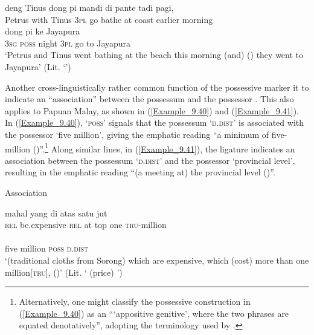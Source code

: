 \ea
\label{Example_9.39}
 {{deng}} {Tinus} {{dong}} {{pi}} {{mandi}} {di} {pante} {tadi} {pagi,}\\ %
 {Petrus}  {with}  Tinus  {\textsc{3pl}}  {go}  {bathe}  at  coast  earlier  morning\\
\gll  {}  {}  {}  {dong}  {pi}  ke  {Jayapura}\\
 \textsc{3sg}  {\textsc{poss}}  {night}  {\textsc{3pl}}  {go}  to  {Jayapura}\\
\glt 
‘Petrus and Tinus went bathing at the beach this morning (and)  ()  they went to Jayapura’ (Lit. ‘’) \textstyleExampleSource{[Elicited BR111020.009]}
\z



Another cross-linguistically rather common function of the possessive marker it to indicate an “association” between the possessum and the possessor \citep[285]{Dixon.2010}. This also applies to Papuan Malay, as shown in (\ref{Example_9.40}) and (\ref{Example_9.41}). In (\ref{Example_9.40}),  ‘\textsc{poss}’ signals that the possessum  ‘\textsc{d.dist}’ is associated with the possessor  ‘five million’, giving the emphatic reading ``a minimum of five-million ()''.\footnote{Alternatively, one might classify the possessive construction in (\ref{Example_9.40}) as an “‘appositive genitive’, where the two  phrases are equated denotatively”, adopting the terminology used by \citet[193]{Quirk.1972}.} Along similar lines, in (\ref{Example_9.41}), the ligature indicates an association between the possessum  ‘\textsc{d.dist}’ and the possessor  ‘provincial level’, resulting in the emphatic reading ``(a meeting at) the provincial level ()''.



\begin{styleExampleTitle}
Association
\end{styleExampleTitle}

\ea
\label{Example_9.40}
 {{mahal}} {{yang}} {di} {atas} {satu} {jut}\\ %
 \textsc{rel}  {be.expensive}  {\textsc{rel}}  at  top  one  \textsc{tru}{}-million\\
\gll {}    {}  {}\\
 five  million  {\textsc{poss}}  {\textsc{d.dist}}\\
\glt 
‘(traditional cloths from Sorong) which are expensive, which (cost) more than one million[\textsc{tru}],  ()’ (Lit. ‘ (price) ’) \textstyleExampleSource{[081006-029-CvEx.0009]}
\z

